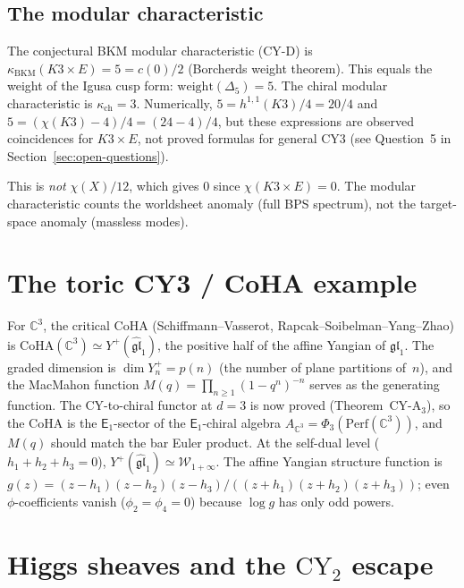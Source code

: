 \documentclass[11pt]{article}
\newcommand{\cW}{\mathcal{W}}
\newcommand{\fgl}{\mathfrak{gl}}
\newcommand{\C}{\mathbb{C}}
\newcommand{\Eone}{\mathsf{E}_1}
\newcommand{\CY}{\mathrm{CY}}
\newcommand{\CoHA}{\mathrm{CoHA}}
\newcommand{\Perf}{\mathrm{Perf}}
\begin{document}
\subsection{The modular characteristic}

The conjectural BKM modular characteristic (CY-D) is
$\kappa_{\mathrm{BKM}}(K3 \times E) = 5 = c(0)/2$ (Borcherds weight theorem). This equals the weight
of the Igusa cusp form: $\mathrm{weight}(\Delta_5) = 5$. The chiral modular characteristic is $\kappa_{\mathrm{ch}} = 3$.
Numerically, $5 = h^{1,1}(K3)/4 = 20/4$
and $5 = (\chi(K3) - 4)/4 = (24-4)/4$,
but these expressions are observed coincidences for
$K3 \times E$, not proved formulas for general CY3 (see Question~5
in Section~\ref{sec:open-questions}).

This is \emph{not} $\chi(X)/12$, which gives $0$ since $\chi(K3 \times E) = 0$. The modular characteristic counts the worldsheet anomaly (full BPS spectrum), not the target-space anomaly (massless modes).

\section{The toric CY3 / CoHA example}

For $\C^3$, the critical CoHA (Schiffmann--Vasserot, Rapcak--Soibelman--Yang--Zhao) is
$\CoHA(\C^3) \simeq Y^+(\widehat{\fgl}_1)$,
the positive half of the affine Yangian of $\fgl_1$.
The graded dimension is $\dim Y^+_n = p(n)$
(the number of plane partitions of~$n$), and the MacMahon function
$M(q) = \prod_{n \geq 1} (1-q^n)^{-n}$ serves as the generating function.
The CY-to-chiral functor at $d = 3$ is now proved (Theorem~CY-A$_3$),
so the CoHA is the $\Eone$-sector of the $\Eone$-chiral
algebra $A_{\C^3} = \Phi_3(\Perf(\C^3))$, and $M(q)$ should match the bar Euler product.
At the self-dual level ($h_1 + h_2 + h_3 = 0$),
$Y^+(\widehat{\fgl}_1) \simeq \cW_{1+\infty}$.
The affine Yangian structure function is
$g(z) = (z - h_1)(z - h_2)(z - h_3)/((z + h_1)(z + h_2)(z + h_3))$;
even $\phi$-coefficients vanish ($\phi_2 = \phi_4 = 0$) because $\log g$ has only odd powers.

\section{Higgs sheaves and the $\CY_2$ escape}
\end{document}
